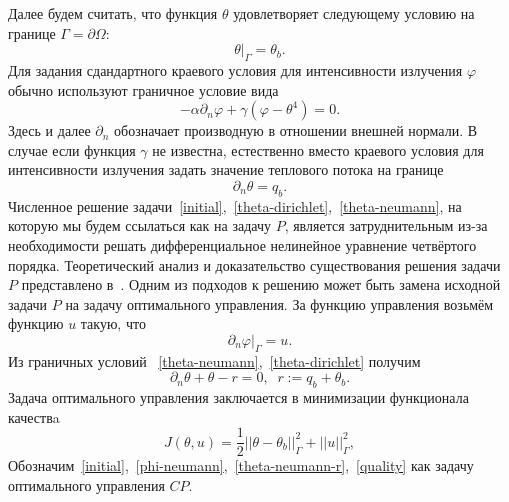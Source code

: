 \documentclass[10pt]{article}
\begin{document}
    Далее будем считать, что функция $\theta$ удовлетворяет следующему условию на границе
    $\Gamma = \partial \Omega$:
    \begin{equation}
        \label{theta-dirichlet}
        \theta|_\Gamma = \theta_b.
    \end{equation}
    Для задания сдандартного краевого условия для интенсивности излучения $\varphi$ обычно
    используют граничное условие вида
    \begin{equation}
        \label{phi-default}
        - \alpha \partial_n \varphi + \gamma (\varphi - \theta ^4) = 0.
    \end{equation}
    Здесь и далее $\partial_n$ обозначает производную в отношении внешней нормали.
    В случае если функция $\gamma$ не известна, естественно вместо краевого условия для
    интенсивности излучения задать значение теплового потока на границе
    \begin{equation}
        \label{theta-neumann}
        \partial_n \theta = q_b.
    \end{equation}
    Численное решение
    задачи~\eqref{initial},~\eqref{theta-dirichlet},~\eqref{theta-neumann},
    на которую мы будем ссылаться как на задачу $P$, является затруднительным из-за необходимости
    решать дифференциальное нелинейное уравнение четвёртого порядка.
    Теоретический анализ и доказательство существования решения задачи $P$ представлено
    в~\cite{cheb-same}.
    Одним из подходов к решению может быть замена исходной задачи $P$ на задачу
    оптимального управления.
    За функцию управления возьмём функцию $u$ такую, что
    \begin{equation}
        \label{phi-neumann}
        \partial_n \varphi |_\Gamma = u.
    \end{equation}
    Из граничных условий ~\eqref{theta-neumann},~\eqref{theta-dirichlet} получим
    \begin{equation}
        \label{theta-neumann-r}
        \partial_n \theta  + \theta - r = 0, \;\; r := q_b + \theta_b.
    \end{equation}
    Задача оптимального управления заключается в минимизации функционала качествa
    \begin{equation}
        \label{quality}
        J(\theta, u) = \frac{1}{2} ||\theta - \theta_b||^2_\Gamma + ||u||^2_\Gamma,
    \end{equation}
    Обозначим~\eqref{initial},~\eqref{phi-neumann},~\eqref{theta-neumann-r},~\eqref{quality}
    как задачу оптимального управления $CP$.
\end{document}
